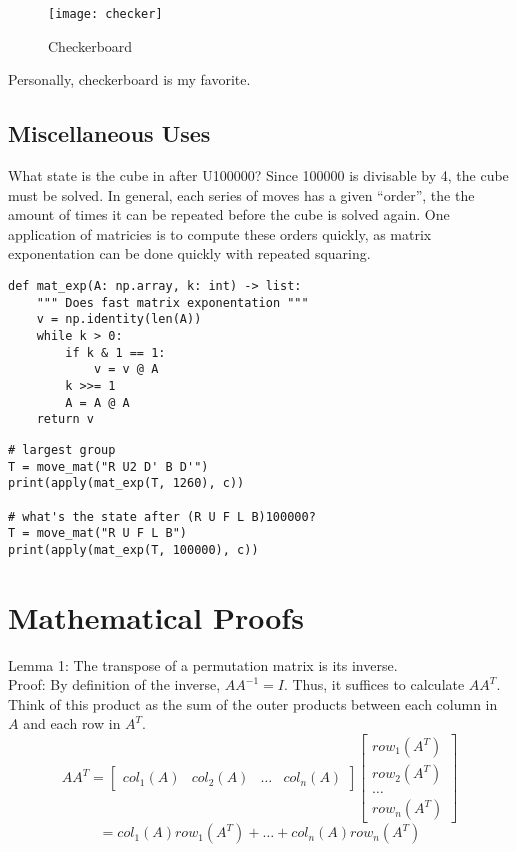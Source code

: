 \documentclass[11pt, oneside]{article}
\begin{document}
\begin{figure}[h!]
\centering
\texttt{[image: checker]}
\caption{Checkerboard}
\end{figure}

Personally, checkerboard is my favorite.

\newpage
\newpage

\subsection{Miscellaneous Uses}

What state is the cube in after U100000? Since 100000 is divisable by 4,
the cube must be solved. In general, each series of moves has a given ``order'',
the the amount of times it can be repeated before the cube is solved again.
One application of matricies is to compute these orders quickly,
as matrix exponentation can be done quickly with repeated squaring.

\begin{verbatim}
def mat_exp(A: np.array, k: int) -> list:
    """ Does fast matrix exponentation """
    v = np.identity(len(A))
    while k > 0:
        if k & 1 == 1:
            v = v @ A
        k >>= 1
        A = A @ A
    return v
\end{verbatim}

\begin{verbatim}
# largest group
T = move_mat("R U2 D' B D'")
print(apply(mat_exp(T, 1260), c))

# what's the state after (R U F L B)100000?
T = move_mat("R U F L B")
print(apply(mat_exp(T, 100000), c))
\end{verbatim}

\section{Mathematical Proofs}

Lemma 1: The transpose of a permutation matrix is its inverse.
\\ Proof: By definition of the inverse, \( A A^{-1} = I \).
Thus, it suffices to calculate \( AA^T \).
Think of this product as the sum of the outer products between
each column in \( A \) and each row in \( A^T \).
\[ AA^T = \begin{bmatrix} col_1(A) & col_2(A) & \dots & col_n(A) \end{bmatrix}
\begin{bmatrix} row_1(A^T) \\ row_2(A^T) \\ \dots \\ row_n(A^T) \end{bmatrix} \]
\[ = col_1(A) row_1(A^T) + \dots + col_n(A) row_n(A^T) \]
\end{document}

